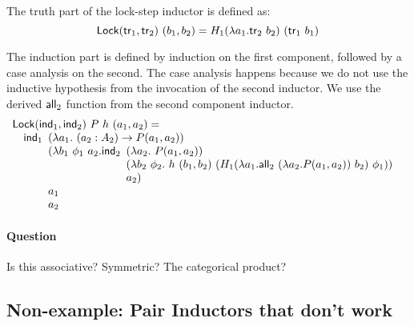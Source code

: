 \documentclass{amsart}
\begin{document}
The truth part of the lock-step inductor is defined as:
\begin{displaymath}
  \mathsf{Lock}(\mathsf{tr}_1, \mathsf{tr}_2)\ (b_1,b_2) = H_1(\lambda a_1. \mathsf{tr}_2\ b_2)\ (\mathsf{tr}_1\ b_1)
\end{displaymath}

The induction part is defined by induction on the first component,
followed by a case analysis on the second. The case analysis happens
because we do not use the inductive hypothesis from the invocation of
the second inductor. We use the derived $\mathsf{all}_2$ function from the
second component inductor.
\begin{displaymath}
  \begin{array}[t]{l}
    \mathsf{Lock}(\ind_1, \ind_2)\ P\ h\ (a_1,a_2) = \\
    \quad \ind_1
    \begin{array}[t]{l}
      (\lambda a_1.\ (a_2 : A_2) \to P(a_1,a_2)) \\
      (\lambda b_1\ \phi_1\ a_2. \ind_2
      \begin{array}[t]{l}
        (\lambda a_2.\ P(a_1,a_2)) \\
        (\lambda b_2\ \phi_2.\ h\ (b_1,b_2)\ (H_1(\lambda a_1. \all_2\ (\lambda a_2. P(a_1,a_2))\ b_2)\ \phi_1)) \\
        a_2)
      \end{array} \\
      a_1 \\
      a_2
    \end{array}
  \end{array}
\end{displaymath}


\paragraph{Question} Is this associative? Symmetric? The categorical
product?

\subsection{Non-example: Pair Inductors that don't work}

\end{document}
